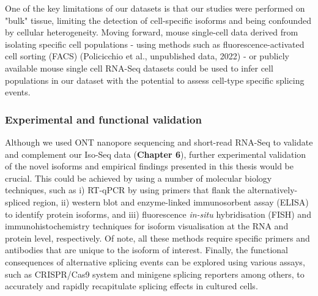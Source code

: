 One of the key limitations of our datasets is that our studies were performed on "bulk" tissue, limiting the detection of cell-specific isoforms and being confounded by cellular heterogeneity. Moving forward, mouse single-cell data derived from isolating specific cell populations - using methods such as fluorescence-activated cell sorting (FACS) (Policicchio  et al., unpublished data, 2022) - or publicly available mouse single cell RNA-Seq datasets could be used to infer cell populations in our dataset with the potential to assess cell-type specific splicing events.   

\subsubsection{Experimental and functional validation}
Although we used ONT nanopore sequencing and short-read RNA-Seq to validate and complement our Iso-Seq data (\textbf{Chapter 6}), further experimental validation of the novel isoforms and empirical findings presented in this thesis would be crucial. This could be achieved by using a number of molecular biology techniques, such as i) RT-qPCR by using primers that flank the alternatively-spliced region, ii) western blot and enzyme-linked immunosorbent assay (ELISA) to identify protein isoforms, and iii) fluorescence \textit{in-situ} hybridisation (FISH) and immunohistochemistry techniques for isoform visualisation at the RNA and protein level, respectively. Of note, all these methods require specific primers and antibodies that are unique to the isoform of interest. Finally, the functional consequences of alternative splicing events can be explored using various assays, such as CRISPR/Cas9 system and minigene splicing reporters among others, to accurately and rapidly recapitulate splicing effects in cultured cells.  


